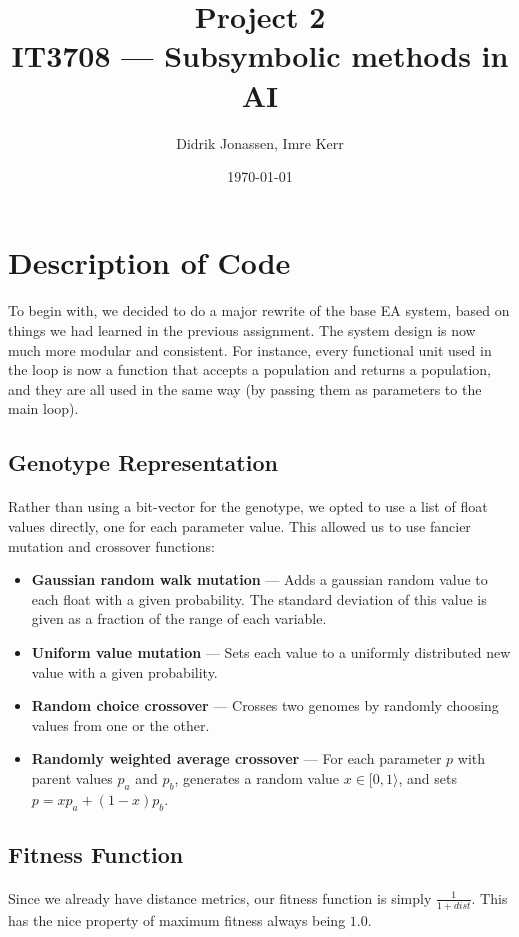 \documentclass[a4paper,12pt]{article}
\author{Didrik Jonassen, Imre Kerr}
\title{Project 2\\ IT3708 --- Subsymbolic methods in AI}
\date{\today}
\begin{document}
\maketitle

\section{Description of Code}

\paragraph{}To begin with, we decided to do a major rewrite of the base EA system, based on things we had learned in the previous assignment. The system design is now much more modular and consistent. For instance, every functional unit used in the loop is now a function that accepts a population and returns a population, and they are all used in the same way (by passing them as parameters to the main loop).

\subsection{Genotype Representation}

\paragraph{}Rather than using a bit-vector for the genotype, we opted to use a list of float values directly, one for each parameter value. This allowed us to use fancier mutation and crossover functions:
\begin{itemize}
\item{\textbf{Gaussian random walk mutation} --- Adds a gaussian random value to each float with a given probability. The standard deviation of this value is given as a fraction of the range of each variable.}
\item{\textbf{Uniform value mutation} --- Sets each value to a uniformly distributed new value with a given probability.}
\item{\textbf{Random choice crossover} --- Crosses two genomes by randomly choosing values from one or the other.}
\item{\textbf{Randomly weighted average crossover} --- For each parameter $p$ with parent values $p_a$ and $p_b$, generates a random value $x \in [ 0, 1 \rangle$, and sets $p = x p_a + (1-x)p_b$.}
\end{itemize}

\subsection{Fitness Function}

\paragraph{}Since we already have distance metrics, our fitness function is simply $\frac{1}{1+dist}$. This has the nice property of maximum fitness always being $1.0$.
\end{document}
